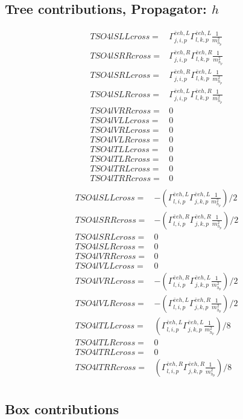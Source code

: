 \documentclass[A4,landscape]{article}
\begin{document}
\subsection{Tree contributions, Propagator: $h$} 

\begin{align} 
  TSO4lSLLcross= & \Gamma^{\bar{e}e h ,L}_{j, i, p} \Gamma^{\bar{e}e h ,L}_{l, k, p} \frac{1}{m^2_{h_{{p}}}} \\ 
  TSO4lSRRcross= & \Gamma^{\bar{e}e h ,R}_{j, i, p} \Gamma^{\bar{e}e h ,R}_{l, k, p} \frac{1}{m^2_{h_{{p}}}} \\ 
  TSO4lSRLcross= & \Gamma^{\bar{e}e h ,R}_{j, i, p} \Gamma^{\bar{e}e h ,L}_{l, k, p} \frac{1}{m^2_{h_{{p}}}} \\ 
  TSO4lSLRcross= & \Gamma^{\bar{e}e h ,L}_{j, i, p} \Gamma^{\bar{e}e h ,R}_{l, k, p} \frac{1}{m^2_{h_{{p}}}} \\ 
  TSO4lVRRcross= & 0 \\ 
  TSO4lVLLcross= & 0 \\ 
  TSO4lVRLcross= & 0 \\ 
  TSO4lVLRcross= & 0 \\ 
  TSO4lTLLcross= & 0 \\ 
  TSO4lTLRcross= & 0 \\ 
  TSO4lTRLcross= & 0 \\ 
  TSO4lTRRcross= & 0 \\ 
\end{align} 
\begin{align} 
  TSO4lSLLcross= & -(\Gamma^{\bar{e}e h ,L}_{l, i, p} \Gamma^{\bar{e}e h ,L}_{j, k, p} \frac{1}{m^2_{h_{{p}}}})/2 \\ 
  TSO4lSRRcross= & -(\Gamma^{\bar{e}e h ,R}_{l, i, p} \Gamma^{\bar{e}e h ,R}_{j, k, p} \frac{1}{m^2_{h_{{p}}}})/2 \\ 
  TSO4lSRLcross= & 0 \\ 
  TSO4lSLRcross= & 0 \\ 
  TSO4lVRRcross= & 0 \\ 
  TSO4lVLLcross= & 0 \\ 
  TSO4lVRLcross= & -(\Gamma^{\bar{e}e h ,R}_{l, i, p} \Gamma^{\bar{e}e h ,L}_{j, k, p} \frac{1}{m^2_{h_{{p}}}})/2 \\ 
  TSO4lVLRcross= & -(\Gamma^{\bar{e}e h ,L}_{l, i, p} \Gamma^{\bar{e}e h ,R}_{j, k, p} \frac{1}{m^2_{h_{{p}}}})/2 \\ 
  TSO4lTLLcross= & (\Gamma^{\bar{e}e h ,L}_{l, i, p} \Gamma^{\bar{e}e h ,L}_{j, k, p} \frac{1}{m^2_{h_{{p}}}})/8 \\ 
  TSO4lTLRcross= & 0 \\ 
  TSO4lTRLcross= & 0 \\ 
  TSO4lTRRcross= & (\Gamma^{\bar{e}e h ,R}_{l, i, p} \Gamma^{\bar{e}e h ,R}_{j, k, p} \frac{1}{m^2_{h_{{p}}}})/8 \\ 
\end{align} 
\subsection{Box contributions} 
\end{document}
